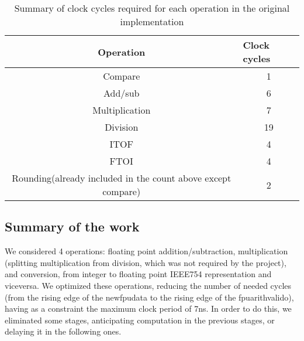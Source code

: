 \begin{table}
\small
\begin{center}
\caption{Summary of clock cycles required for each operation in the original implementation}

\begin{tabular}{@{}|c|c|@{}}
\toprule
\textbf{Operation    }                                                & \multicolumn{1}{l|}{\textbf{Clock cycles}} \\ \midrule
Compare                                                      & 1                                 \\ \midrule
Add/sub                                                      & 6                                 \\ \midrule
Multiplication                                               & 7                                 \\ \midrule
Division                                                     & 19                                \\ \midrule
ITOF                                                         & 4                                 \\ \midrule
FTOI                                                         & 4                                 \\ \midrule
Rounding(already included in the count above except compare) & 2                                 \\ \bottomrule
\end{tabular}
  \label{tab:firstTiming}
\end{center}
\end{table}

\subsection{Summary of the work}
We considered 4 operations: floating point addition/subtraction, multiplication (splitting multiplication from division, which was not required by the project), and conversion, from integer to floating point IEEE754 representation and viceversa. We optimized these operations, reducing the number of needed cycles (from the rising edge of the new\textunderscore fpu\textunderscore data to the rising edge of the fpu\textunderscore arith\textunderscore valid\textunderscore o), having as a constraint the maximum clock period of 7ns. In order to do this, we eliminated some stages, anticipating computation in the previous stages, or delaying it in the following ones.

